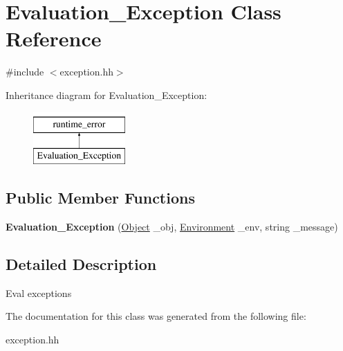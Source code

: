 \hypertarget{classEvaluation__Exception}{\section{Evaluation\-\_\-\-Exception Class Reference}
\label{classEvaluation__Exception}
}


{\ttfamily \#include $<$exception.\-hh$>$}

Inheritance diagram for Evaluation\-\_\-\-Exception\-:\begin{figure}[H]
\begin{center}
\leavevmode
\includegraphics[height=2.000000cm]{classEvaluation__Exception}
\end{center}
\end{figure}
\subsection*{Public Member Functions}
\begin{DoxyCompactItemize}
\item 
\hypertarget{classEvaluation__Exception_af7d73fddff98cbc5d503b18be20582f9}{{\bfseries Evaluation\-\_\-\-Exception} (\hyperlink{classCell}{Object} \-\_\-obj, \hyperlink{classEnvironment}{Environment} \-\_\-env, string \-\_\-message)}\label{classEvaluation__Exception_af7d73fddff98cbc5d503b18be20582f9}

\end{DoxyCompactItemize}


\subsection{Detailed Description}
Eval exceptions 

The documentation for this class was generated from the following file\-:\begin{DoxyCompactItemize}
\item 
exception.\-hh\end{DoxyCompactItemize}
